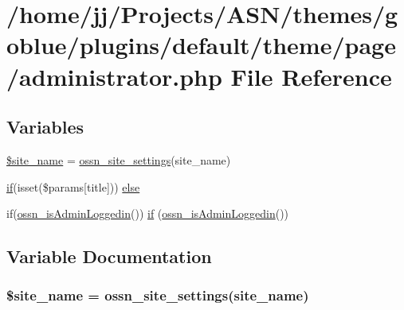 \hypertarget{theme_2page_2administrator_8php}{}\section{/home/jj/\+Projects/\+A\+S\+N/themes/goblue/plugins/default/theme/page/administrator.php File Reference}
\label{theme_2page_2administrator_8php}
\subsection*{Variables}
\begin{DoxyCompactItemize}
\item 
\hyperlink{theme_2page_2administrator_8php_a88731dab3c4c22236ebc505440062b2d}{\$site\+\_\+name} = \hyperlink{ossn_8lib_8system_8php_a610e2045b8a86c09f777b4d82e24e34c}{ossn\+\_\+site\+\_\+settings}(\textquotesingle{}site\+\_\+name\textquotesingle{})
\item 
\hyperlink{jquery_8tokeninput_8js_ad8dd46a3cbc004569e34401e9e71771a}{if}(isset(\$params\mbox{[}\textquotesingle{}title\textquotesingle{}\mbox{]})) \hyperlink{theme_2page_2administrator_8php_ae0388a3b2d3bf8304fcd2f91d5783299}{else}
\item 
if(\hyperlink{ossn_8lib_8users_8php_abf45a4c659ffd196160e8173c2af1106}{ossn\+\_\+is\+Admin\+Loggedin}()) \hyperlink{theme_2page_2administrator_8php_a8ed236a6397fa5eb5698db5d7f2bd495}{if} (\hyperlink{ossn_8lib_8users_8php_abf45a4c659ffd196160e8173c2af1106}{ossn\+\_\+is\+Admin\+Loggedin}())
\end{DoxyCompactItemize}


\subsection{Variable Documentation}
\subsubsection[{\texorpdfstring{\$site\+\_\+name}{$site_name}}]{\setlength{\rightskip}{0pt plus 5cm}\$site\+\_\+name = {\bf ossn\+\_\+site\+\_\+settings}(\textquotesingle{}site\+\_\+name\textquotesingle{})}\hypertarget{theme_2page_2administrator_8php_a88731dab3c4c22236ebc505440062b2d}{}\label{theme_2page_2administrator_8php_a88731dab3c4c22236ebc505440062b2d}


